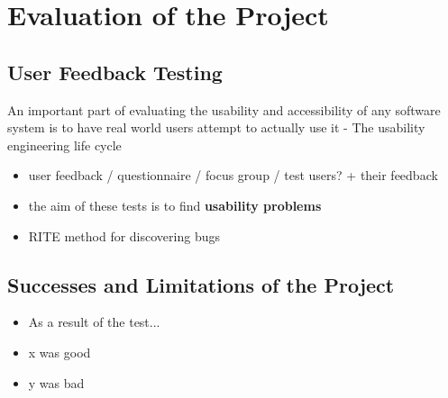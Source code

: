 \section{Evaluation of the Project}

\subsection{User Feedback Testing}
An important part of evaluating the usability and accessibility of any software system is
to have real world users attempt to actually use it - The usability engineering life cycle \cite{nielsen1992usability}
{\color{red}
	\begin{itemize}
		\item user feedback / questionnaire / focus group / test users? + their feedback
		\item the aim of these tests is to find \textbf{usability problems}
		\item RITE method for discovering bugs
	\end{itemize}
}

\subsection{Successes and Limitations of the Project}
{\color{red}
	\begin{itemize}
		\item As a result of the test...
		\item x was good
		\item y was bad
	\end{itemize}
}
